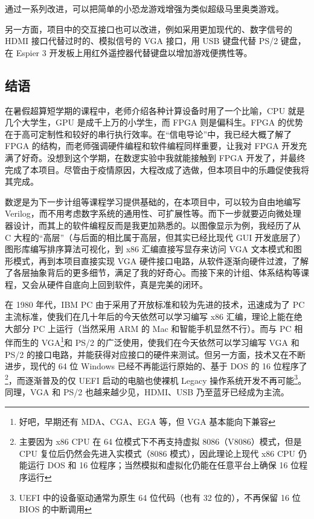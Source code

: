 \documentclass[hyperref,UTF8,12pt,a4paper]{ctexart}
\begin{document}
通过一系列改进，可以把简单的小恐龙游戏增强为类似超级马里奥类游戏。

另一方面，项目中的交互接口也可以改进，例如采用更加现代的、数字信号的
HDMI 接口代替过时的、模拟信号的 VGA 接口，用 USB 键盘代替 PS/2 键盘，在
Espier 3 开发板上用红外遥控器代替键盘以增加游戏便携性等。

\hypertarget{ux7ed3ux8bed}{%
\subsection{结语}\label{ux7ed3ux8bed}}

在暑假超算短学期的课程中，老师介绍各种计算设备时用了一个比喻，CPU
就是几个大学生，GPU 是成千上万的小学生，而 FPGA 则是偏科生。FPGA
的优势在于高可定制性和较好的串行执行效率。在``信电导论''中，我已经大概了解了
FPGA 的结构，而老师强调硬件编程和软件编程同样重要，让我对 FPGA
开发充满了好奇。没想到这个学期，在数逻实验中我就能接触到 FPGA
开发了，并最终完成了本项目。尽管由于疫情原因，大程改成了选做，但本项目中的乐趣促使我将其完成。

数逻是为下一步计组等课程学习提供基础的，在本项目中，可以较为自由地编写
Verilog，而不用考虑数字系统的通用性、可扩展性等。而下一步就要迈向微处理器设计，而其上的软件编程反而是我更加熟悉的。以图像显示为例，我经历了从
C 大程的``高层''（与后面的相比属于高层，但其实已经比现代 GUI
开发底层了）图形库编写排序算法可视化，到 x86 汇编直接写显存来访问 VGA
文本模式和图形模式，再到本项目直接实现 VGA
硬件接口电路，从软件逐渐向硬件过渡，了解了各层抽象背后的更多细节，满足了我的好奇心。而接下来的计组、体系结构等课程，又会从硬件自底向上回到软件，真是完美的闭环。

在 1980 年代，IBM PC 由于采用了开放标准和较为先进的技术，迅速成为了 PC
主流标准，使我们在几十年后的今天依然可以学习编写 x86
汇编，理论上能在绝大部分 PC 上运行（当然采用 ARM 的 Mac
和智能手机显然不行）。而与 PC 相伴而生的 VGA\footnote{好吧，早期还有
  MDA、CGA、EGA 等，但 VGA 基本能向下兼容}和 PS/2
的广泛使用，使我们在今天依然可以学习编写 VGA 和 PS/2
的接口电路，并能获得对应接口的硬件来测试。但另一方面，技术又在不断进步，现代的
64 位 Windows 已经不再能运行原始的、基于 DOS 的 16
位程序了\footnote{主要因为 x86 CPU 在 64 位模式下不再支持虚拟
  8086（V8086）模式，但是 CPU 复位后仍然会先进入实模式（8086
  模式），因此理论上现代 x86 CPU 仍能运行 DOS 和 16
  位程序；当然模拟和虚拟化仍能在任意平台上确保 16 位程序运行}，而逐渐普及的仅
UEFI 启动的电脑也使裸机 Legacy
操作系统开发不再可能\footnote{UEFI 中的设备驱动通常为原生 64
  位代码（也有 32 位的），不再保留 16 位 BIOS 的中断调用}。同理，VGA 和
PS/2 也越来越少见，HDMI、USB 乃至蓝牙已经成为主流。
\end{document}
